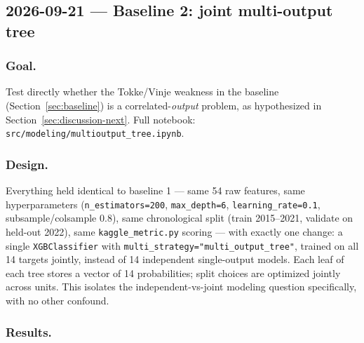 \subsection{2026-09-21 --- Baseline 2: joint multi-output tree}
\label{sec:multioutput}

\subsubsection*{Goal.} Test directly whether the Tokke/Vinje weakness in the baseline
(Section~\ref{sec:baseline}) is a correlated-\emph{output} problem, as hypothesized in
Section~\ref{sec:discussion-next}. Full notebook:
\texttt{src/modeling/multioutput\_tree.ipynb}.

\subsubsection*{Design.} Everything held identical to baseline 1 --- same 54 raw features, same
hyperparameters (\texttt{n\_estimators=200}, \texttt{max\_depth=6}, \texttt{learning\_rate=0.1},
subsample/colsample 0.8), same chronological split (train 2015--2021, validate on held-out
2022), same \texttt{kaggle\_metric.py} scoring --- with exactly one change: a single
\texttt{XGBClassifier} with \texttt{multi\_strategy="multi\_output\_tree"}, trained on all 14
targets jointly, instead of 14 independent single-output models. Each leaf of each tree stores a
vector of 14 probabilities; split choices are optimized jointly across units. This isolates the
independent-vs-joint modeling question specifically, with no other confound.

\subsubsection*{Results.}

